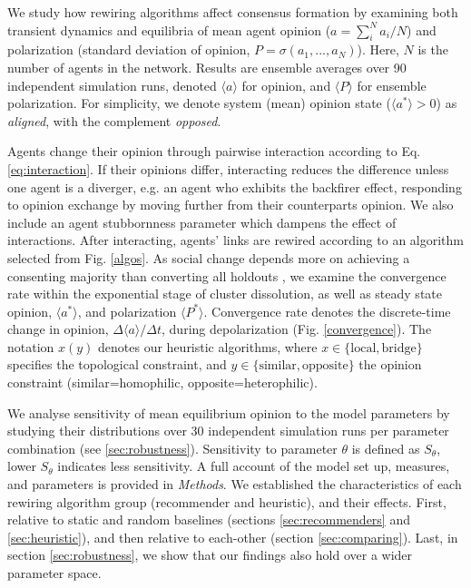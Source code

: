 \documentclass[unnumsec,webpdf,contemporary,large]{oup-authoring-template}%
\theoremstyle{thmstyleone}%
\theoremstyle{thmstyletwo}%
\theoremstyle{thmstylethree}%
\begin{document}
We study how rewiring algorithms affect consensus formation by examining both transient dynamics and equilibria of mean agent opinion ($a = \sum_{i}^{N}a_i/N$) and polarization (standard deviation of opinion, $P = \sigma(a_1, ..., a_N)$). Here, $N$ is the number of agents in the network. Results are ensemble averages over 90 independent simulation runs, denoted $\langle a \rangle$ for opinion, and $\langle P \rangle$ for ensemble polarization. For simplicity, we denote system (mean) opinion state ($\langle a^* \rangle > 0$) as \textit{aligned}, with the complement \textit{opposed}.

Agents change their opinion through pairwise interaction according to Eq. \ref{eq:interaction}. If their opinions differ, interacting reduces the difference unless one agent is a diverger, e.g. an agent who exhibits the backfirer effect, responding to opinion exchange by moving further from their counterparts opinion. We also include an agent stubbornness parameter which dampens the effect of  interactions. After interacting, agents' links are rewired according to an algorithm selected from Fig. \ref{algos}. As social change depends more on achieving a consenting majority than converting all holdouts \citep{andersson_dynamics_2021,otto_social_2020,gardiner_perfect_2011}, we examine the convergence rate within the exponential stage of cluster dissolution, as well as steady state opinion, $\langle a^* \rangle$, and polarization $\langle P^* \rangle$. Convergence rate denotes the discrete-time change in opinion, $\Delta\langle a\rangle/\Delta t$, during depolarization (Fig. \ref{convergence}). The notation $x(y)$ denotes our heuristic algorithms, where $x \in \{\text{local}, \text{bridge}\}$ specifies the topological constraint, and $y \in \{\text{similar}, \text{opposite}\}$ the opinion constraint (similar=homophilic, opposite=heterophilic).

We analyse sensitivity of mean equilibrium opinion to the model parameters by studying their distributions over 30 independent simulation runs per parameter combination (see \ref{sec:robustness}). Sensitivity to parameter $\theta$ is defined as $S_{\theta}$, lower $S_\theta$ indicates less sensitivity. A full account of the model set up, measures, and parameters is provided in \textit{Methods}. We established the characteristics of each rewiring algorithm group (recommender and heuristic), and their effects. First, relative to static and random baselines (sections \ref{sec:recommenders} and \ref{sec:heuristic}), and then relative to each-other (section \ref{sec:comparing}). Last, in section \ref{sec:robustness}, we show that our findings also hold over a wider parameter space.
\end{document}
